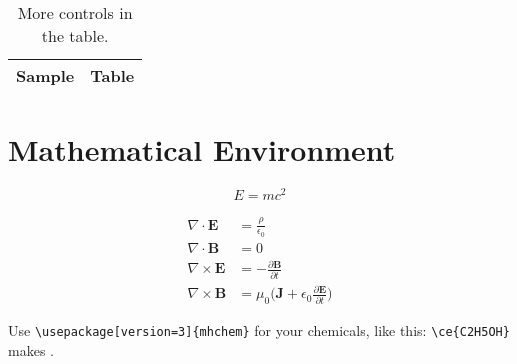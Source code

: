 \documentclass{emory}
\begin{document}
\begin{table}
  \centering
  \caption{More controls in the table.}
  \begin{tabular}{l l}
    \hline
    Sample & Table \\
    \hline
  \end{tabular}
\end{table}


\chapter{Mathematical Environment}
\begin{equation}
  E = mc^2
\end{equation}

\begin{subequations}
\begin{align}
  \nabla\cdot\pmb{E}&=\frac{\rho}{\epsilon_0}\\
  \nabla\cdot\pmb{B}&=0\\
  \nabla\times\pmb{E}&=-\frac{\partial\pmb{B}}{\partial t}\\
  \nabla\times\pmb{B}&=\mu_0\Big(\pmb{J}+\epsilon_0\frac{\partial\pmb{E}}{\partial t}\Big)
\end{align}
\end{subequations}

Use \verb|\usepackage[version=3]{mhchem}| for your chemicals, like this:
\verb|\ce{C2H5OH}| makes .



\end{document}
